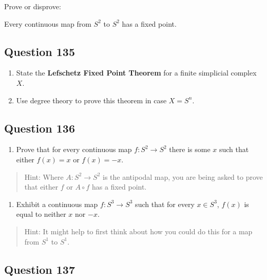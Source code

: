 \documentclass[12pt]{article}
\providecommand{\tightlist}{%
  \setlength{\itemsep}{0pt}\setlength{\parskip}{0pt}}
\begin{document}
Prove or disprove:

Every continuous map from \(S^2\) to \(S^2\) has a fixed point.

\hypertarget{question-135-1}{%
\subsection{Question 135}\label{question-135-1}}

\begin{enumerate}
\def\labelenumi{\alph{enumi}.}
\item
  State the \textbf{Lefschetz Fixed Point Theorem} for a finite
  simplicial complex \(X\).
\item
  Use degree theory to prove this theorem in case \(X = S^n\).
\end{enumerate}

\hypertarget{question-136-1}{%
\subsection{Question 136}\label{question-136-1}}

\begin{enumerate}
\def\labelenumi{\alph{enumi}.}
\tightlist
\item
  Prove that for every continuous map \(f : S^2 \to S^2\) there is some
  \(x\) such that either \(f (x) = x\) or \(f (x) = -x\).
\end{enumerate}

\begin{quote}
Hint: Where \(A : S^2 \to S^2\) is the antipodal map, you are being
asked to prove that either \(f\) or \(A \circ f\) has a fixed point.
\end{quote}

\begin{enumerate}
\def\labelenumi{\alph{enumi}.}
\setcounter{enumi}{1}
\tightlist
\item
  Exhibit a continuous map \(f : S^3 \to S^3\) such that for every
  \(x \in S^3\), \(f (x)\) is equal to neither \(x\) nor \(-x\).
\end{enumerate}

\begin{quote}
Hint: It might help to first think about how you could do this for a map
from \(S^1\) to \(S^1\).
\end{quote}

\hypertarget{question-137-1}{%
\subsection{Question 137}\label{question-137-1}}
\end{document}
